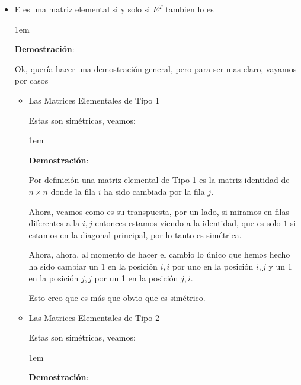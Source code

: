 \documentclass[12pt, fleqn]{report}                             %
\newenvironment{SmallIndentation}[1][0.75em]                    %
        {\begin{adjustwidth}{#1}{}\begin{footnotesize}}             %
        {\end{footnotesize}\end{adjustwidth}}                       %
\theoremstyle{break}                                            %
\begin{document}
\begin{itemize}
                \item
                    E es una matriz elemental si y solo si $E^T$ tambien lo es

                    \begin{SmallIndentation}[1em]
                        \textbf{Demostración}:
                        
                        Ok, quería hacer una demostración general, pero para ser mas claro, vayamos por casos
                        \begin{itemize}
                            \item Las Matrices Elementales de Tipo 1

                                Estas son simétricas, veamos:
                                \begin{SmallIndentation}[1em]
                                    \textbf{Demostración}:
                                    
                                    Por definición una matriz elemental de Tipo 1 es la matriz identidad de $n \times n$
                                    donde la fila $i$ ha sido cambiada por la fila $j$.

                                    Ahora, veamos como es su transpuesta, por un lado, si miramos en filas diferentes a la $i, j$
                                    entonces estamos viendo a la identidad, que es solo $1$ si estamos en la diagonal principal, por
                                    lo tanto es simétrica.

                                    Ahora, ahora, al momento de hacer el cambio lo único que hemos hecho ha sido cambiar un $1$ en la
                                    posición $i, i$ por uno en la posición $i, j$ y un 1 en la posición $j, j$ por un 1 en la posición $j, i$.

                                    Esto creo que es más que obvio que es simétrico.

                                \end{SmallIndentation}

                            \item Las Matrices Elementales de Tipo 2

                                Estas son simétricas, veamos:
                                \begin{SmallIndentation}[1em]
                                    \textbf{Demostración}:
                                    

\end{SmallIndentation}
\end{itemize}
\end{SmallIndentation}
\end{itemize}
\end{document}
